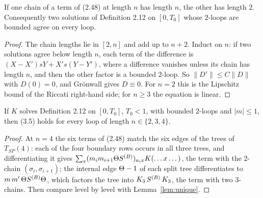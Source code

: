 \begin{lemma}\label{lem:unique}
  \leanok
  If one chain of a term of (2.48) at length $n$ has length $n$, the other has length $2$.
  Consequently two solutions of Definition 2.12 on $[0,T_0]$ whose $2$-loops are bounded
  agree on every loop.
\end{lemma}
\begin{proof}\leanok{}
  The chain lengths lie in $[2,n]$ and add up to $n+2$.  Induct on $n$: if two solutions
  agree below length $n$, each term of the difference is
  $(X-X')sY+X's(Y-Y')$, where a difference vanishes unless its chain has length $n$, and
  then the other factor is a bounded $2$-loop.  So $\|D'\|\le C\|D\|$ with $D(0)=0$, and
  Gr\"onwall gives $D\equiv0$.  For $n=2$ this is the Lipschitz bound of the Riccati
  right-hand side; for $n\ge3$ the equation is linear.
\end{proof}

\begin{lemma}\label{lem:3.4-small}
  \leanok
  If $K$ solves Definition 2.12 on $[0,T_0]$, $T_0<1$, with bounded $2$-loops and $|m|\le1$,
  then (3.5) holds for every loop of length $n\in\{2,3,4\}$.
\end{lemma}
\begin{proof}\leanok{}
  At $n=4$ the six terms of (2.48) match the six edges of the trees of $T_{SP}(4)$: each of
  the four boundary rows occurs in all three trees, and differentiating it gives
  $\sum_x(m_im_{i+1}\Theta S^{(B)})_{a_ix}K(\dots x\dots)$, the term with the $2$-chain
  $(\sigma_i,\sigma_{i+1})$; the internal edge $\Theta-1$ of each split tree differentiates to
  $m\,m'\,\Theta S^{(B)}\Theta$, which factors the tree into $K_3\,S^{(B)}\,K_3$, the term with two $3$-chains.
  Then compare level by level with Lemma~\ref{lem:unique}.
\end{proof}

